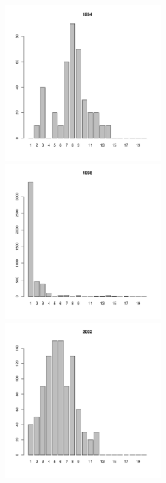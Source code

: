 \begin{figure}[h]
\begin{multicols}{3}
\hfill
\includegraphics[width=60mm]{../White_Sea/Luvenga_Goreliy/low_1994_.pdf}
\hfill
\includegraphics[width=60mm]{../White_Sea/Luvenga_Goreliy/low_1998_.pdf}
\hfill
\includegraphics[width=60mm]{../White_Sea/Luvenga_Goreliy/low_2002_.pdf}
\end{multicols}



\end{figure}
